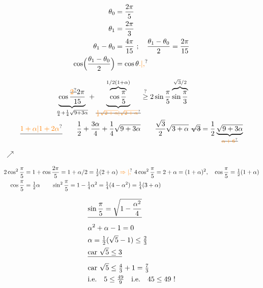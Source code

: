 \[
\begin{aligned}
\theta_0&=\frac{2\pi}{5}\\
\theta_1&=\frac{2\pi}{3}\\
\theta_1-\theta_0&=\frac{4\pi}{15}\ ;\quad \frac{\theta_1-\theta_0}{2}=\frac{2\pi}{15}\\
\cos\Bigl(\frac{\theta_1-\theta_0}{2}\Bigr)&=\cos\theta\unsure{.|,}
\end{aligned}
\]

\[
\begin{aligned}
 \underbrace{\cos\frac{\deleted{\unsure{2}}2\pi}{15}}_{\frac{\alpha}4+\frac14\sqrt{9+3\alpha}}
 +\underbrace{\overbrace{\cos\frac{\pi}{5}}^{1/2(1+\alpha)}}_{\deleted{\unsure{\frac12\sqrt{2+\alpha}|\sqrt{2+\alpha}}}}
 &\overset{?}{\geq}2\sin\frac{\pi}{5}\overbrace{\sin\frac{\pi}{3}}^{\sqrt3/2}\\
 \deleted{\unsure{1+\alpha|1+2\alpha}}\qquad
 \frac12+\frac{3\alpha}4+\frac14\sqrt{9+3\alpha}
 &\qquad\frac{\sqrt3}{2}\sqrt{3+\alpha}\ \deleted{\sqrt3}
 =\frac12\underbrace{\sqrt{9+3\alpha}}_{\deleted{\unsure{\alpha+6}}}
\end{aligned}
\]
\,$\nearrow$

\[
\begin{aligned}
2\cos^2\frac{\pi}{5}&=1+\cos\frac{2\pi}{5}=1+\alpha/2=\tfrac12(2+\alpha)
 \ \unsure{\Rightarrow|,\!}\ 4\cos^2\frac{\pi}{5}=2+\alpha=(1+\alpha)^2,\quad
 \cos\frac{\pi}{5}=\tfrac12(1+\alpha)\\
\cos\frac{\pi}{5}&=\tfrac12\alpha\qquad
 \sin^2\frac{\pi}{5}=1-\tfrac14\alpha^2=\tfrac14(4-\alpha^2)=\tfrac14(3+\alpha)
\end{aligned}
\]

\[
\begin{aligned}
 &\deleted{\sin\frac{\pi}{5}=\sqrt{1-\frac{\alpha^2}{4}}}\\
 &\alpha^2+\alpha-1=0\\
 &\alpha=\tfrac12(\sqrt5-1)\leq\tfrac23\\
 &\deleted{\text{car }\sqrt5\leq3}\\
 &\text{car }\sqrt5\leq\tfrac43+1=\tfrac73\\
 &\text{i.e.}\quad5\leq\tfrac{49}{9}\quad\text{i.e.}\quad45\leq49\ !
\end{aligned}
\]

